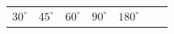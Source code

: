 {\begin{center}
\begin{xtabular*}{\mytablewidth}[t]{|p{10\mystarwidth}|p{10\mystarwidth}|p{10\mystarwidth}|p{10\mystarwidth}|p{10\mystarwidth}|p{10\mystarwidth}|p{10\mystarwidth}|}
    
        
                  \begin{math}{30}^{\circ }\end{math}
                 &
    
    
        
                  \begin{math}{45}^{\circ }\end{math}
                 &
    
    
        
                  \begin{math}{60}^{\circ }\end{math}
                 &
    
    
        
                  \begin{math}{90}^{\circ }\end{math}
                 &
    
    
        
                  \begin{math}{180}^{\circ }\end{math}
     \tabularnewline{}
    

\end{xtabular*}
\end{center}}
